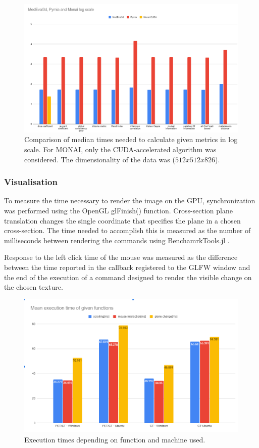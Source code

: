 \documentclass{juliacon}
\begin{document}
\begin{figure}[h!]
	\centering
	\includegraphics[width=\columnwidth]{bk.png}
	\caption{Comparison of median times needed to calculate given metrics in log scale. For MONAI, only the CUDA-accelerated algorithm was considered. The dimensionality of the data was ($ 512x512x826 $).  }
	\label{fig:bk}
\end{figure}

\subsubsection{Visualisation}

To measure the time necessary to  render the image on the GPU, synchronization was performed using the OpenGL glFinish() function.
Cross-section plane translation changes the single coordinate that specifies the plane in a chosen cross-section. The time needed to accomplish this is measured as the number of milliseconds between rendering the commands using BenchamrkTools.jl \cite{BenchmarkTools}. 

Response to the left click time of the mouse was measured as the difference between the time reported in the callback registered to the GLFW window and the end of the execution of a command designed to render the visible change on the chosen texture.

\begin{figure}[t!]
	\centering
	\includegraphics[width=\columnwidth]{Przechwytywanie.png}
	\caption{Execution times depending on function and machine used.}
	\label{fig:Przechwytywanie}
	\centering
\end{figure}
\end{document}
